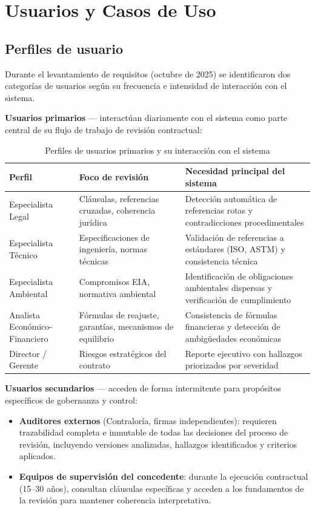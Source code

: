 \section*{Usuarios y Casos de Uso}

\subsection{Perfiles de usuario}

Durante el levantamiento de requisitos (octubre de 2025) se identificaron dos
categorías de usuarios según su frecuencia e intensidad de interacción con el sistema.

\textbf{Usuarios primarios} — interactúan diariamente con el sistema como parte
central de su flujo de trabajo de revisión contractual:

\begin{table}[H]
\centering
\caption{Perfiles de usuarios primarios y su interacción con el sistema}
\label{tab:usuarios_primarios}
\begin{tabular}{p{3.5cm}p{4.5cm}p{5cm}}
\toprule
\textbf{Perfil} & \textbf{Foco de revisión} & \textbf{Necesidad principal del sistema} \\
\midrule
Especialista Legal &
Cláusulas, referencias cruzadas, coherencia jurídica &
Detección automática de referencias rotas y contradicciones procedimentales \\
Especialista Técnico &
Especificaciones de ingeniería, normas técnicas &
Validación de referencias a estándares (ISO, ASTM) y consistencia técnica \\
Especialista Ambiental &
Compromisos EIA, normativa ambiental &
Identificación de obligaciones ambientales dispersas y verificación de cumplimiento \\
Analista Económico-Financiero &
Fórmulas de reajuste, garantías, mecanismos de equilibrio &
Consistencia de fórmulas financieras y detección de ambigüedades económicas \\
Director / Gerente &
Riesgos estratégicos del contrato &
Reporte ejecutivo con hallazgos priorizados por severidad \\
\bottomrule
\end{tabular}
\end{table}

\textbf{Usuarios secundarios} — acceden de forma intermitente para propósitos
específicos de gobernanza y control:

\begin{itemize}
    \item \textbf{Auditores externos} (Contraloría, firmas independientes): requieren
    trazabilidad completa e inmutable de todas las decisiones del proceso de revisión,
    incluyendo versiones analizadas, hallazgos identificados y criterios aplicados.
    \item \textbf{Equipos de supervisión del concedente}: durante la ejecución
    contractual (15--30 años), consultan cláusulas específicas y acceden a los
    fundamentos de la revisión para mantener coherencia interpretativa.
\end{itemize}

